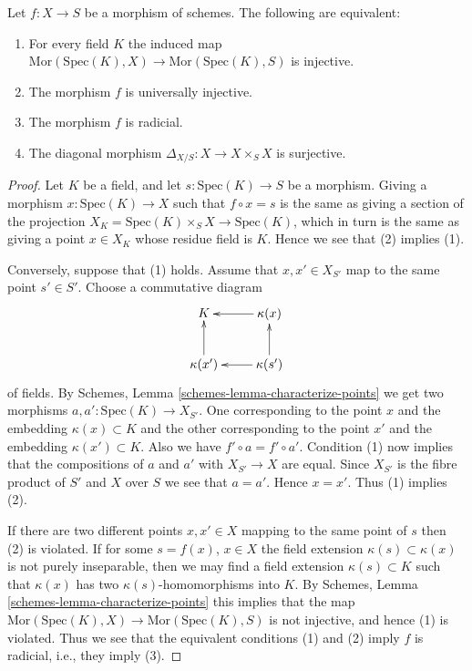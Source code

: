 \begin{lemma}
\label{lemma-universally-injective}
Let $f : X \to S$ be a morphism of schemes.
The following are equivalent:
\begin{enumerate}
\item For every field $K$ the induced map
$\text{Mor}(\text{Spec}(K), X) \to \text{Mor}(\text{Spec}(K), S)$
is injective.
\item The morphism $f$ is universally injective.
\item The morphism $f$ is radicial.
\item The diagonal morphism $\Delta_{X/S} : X \longrightarrow X \times_S X$
is surjective.
\end{enumerate}
\end{lemma}

\begin{proof}
Let $K$ be a field, and let $s : \text{Spec}(K) \to S$ be a morphism.
Giving a morphism $x : \text{Spec}(K) \to X$ such that $f \circ x = s$
is the same as giving a section of the projection
$X_K = \text{Spec}(K) \times_S X \to \text{Spec}(K)$, which in turn
is the same as giving a point $x \in X_K$ whose residue field is $K$.
Hence we see that (2) implies (1).

\medskip\noindent
Conversely, suppose that (1) holds. Assume that $x, x' \in X_{S'}$
map to the same point $s' \in S'$. Choose a commutative diagram
$$
\xymatrix{
K & \kappa(x) \ar[l] \\
\kappa(x') \ar[u] & \kappa(s') \ar[l] \ar[u]
}
$$
of fields. By Schemes, Lemma \ref{schemes-lemma-characterize-points}
we get two morphisms $a, a' : \text{Spec}(K) \to X_{S'}$. One corresponding
to the point $x$ and the embedding $\kappa(x) \subset K$ and
the other corresponding to the  point $x'$ and the embedding
$\kappa(x') \subset K$. Also we have $f' \circ a = f' \circ a'$.
Condition (1) now implies that the compositions of $a$ and $a'$ with
$X_{S'} \to X$ are equal. Since $X_{S'}$ is the fibre product
of $S'$ and $X$ over $S$ we see that $a = a'$. Hence $x = x'$.
Thus (1) implies (2).

\medskip\noindent
If there are two different points $x, x' \in X$ mapping to the same point of $s$
then (2) is violated.
If for some $s = f(x)$, $x \in X$ the field extension
$\kappa(s) \subset \kappa(x)$ is not purely inseparable, then
we may find a field extension $\kappa(s) \subset K$ such that
$\kappa(x)$ has two $\kappa(s)$-homomorphisms into $K$. By
Schemes, Lemma \ref{schemes-lemma-characterize-points} this
implies that the map
$\text{Mor}(\text{Spec}(K), X) \to \text{Mor}(\text{Spec}(K), S)$
is not injective, and hence (1) is violated.
Thus we see that the equivalent conditions (1) and (2) imply
$f$ is radicial, i.e., they imply (3).


\end{proof}
